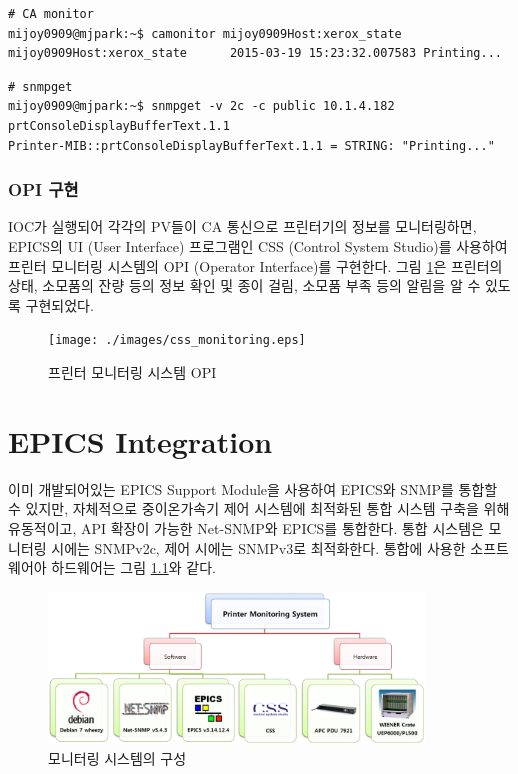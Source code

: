 \documentclass[11pt
  , a4paper
  , article
  , oneside
]{memoir}
\begin{document}
\begin{enumerate}
\begin{lstlisting}[style=termstyle]
# CA monitor
mijoy0909@mjpark:~$ camonitor mijoy0909Host:xerox_state
mijoy0909Host:xerox_state      2015-03-19 15:23:32.007583 Printing...  
\end{lstlisting}

\begin{lstlisting}[style=termstyle]
# snmpget
mijoy0909@mjpark:~$ snmpget -v 2c -c public 10.1.4.182 prtConsoleDisplayBufferText.1.1
Printer-MIB::prtConsoleDisplayBufferText.1.1 = STRING: "Printing..."
\end{lstlisting}

\end{enumerate}

\subsection{OPI 구현}
IOC가 실행되어 각각의 PV들이 CA 통신으로 프린터기의 정보를 모니터링하면, EPICS의 UI (User Interface) 프로그램인 CSS (Control System Studio)를 사용하여 프린터 모니터링 시스템의 OPI (Operator Interface)를 구현한다. 그림 \ref{fig:css_monitoring}은 프린터의 상태, 소모품의 잔량 등의 정보 확인 및 종이 걸림, 소모품 부족 등의 알림을 알 수 있도록 구현되었다.

\begin{figure}[h!]
  \centering
  \texttt{[image: ./images/css\_monitoring.eps]}
  \caption{프린터 모니터링 시스템 OPI}
  \label{fig:css_monitoring}   
\end{figure}

\clearpage

\chapter{EPICS Integration}
이미 개발되어있는 EPICS Support Module을 사용하여 EPICS와 SNMP를 통합할 수 있지만, 자체적으로 중이온가속기 제어 시스템에 최적화된 통합 시스템 구축을 위해 유동적이고, API 확장이 가능한 Net-SNMP와 EPICS를 통합한다. 통합 시스템은 모니터링 시에는 SNMPv2c, 제어 시에는 SNMPv3로 최적화한다. 통합에 사용한 소프트웨어아 하드웨어는 그림 \ref{fig:integ2}와 같다.

\begin{figure}[h!]
  \centering
  \includegraphics[width=0.89\textwidth]{./images/integ2.eps}
  \caption{모니터링 시스템의 구성}
  \label{fig:integ2}   
\end{figure}
\end{document}
